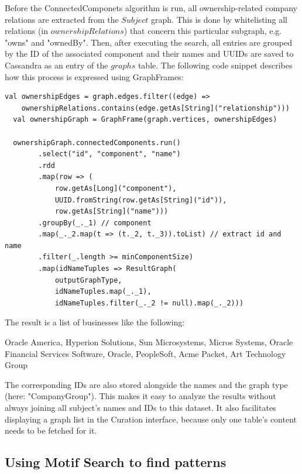 \documentclass[
        a4paper,     %
        titlepage,   %
        oneside,     %
        parskip      %
        ]{scrartcl}  %
\begin{document}
  Before the ConnectedComponets algorithm is run, all ownership-related company
  relations are extracted from the $Subject$ graph. This is done by whitelisting
  all relations (in $ownershipRelations$) that concern this particular subgraph,
  e.g. "owns" and "ownedBy".
  Then, after executing the search, all entries are grouped by the ID of the
  associated component and their names and UUIDs are saved to Cassandra
  as an entry of the $graphs$ table. The following code snippet describes how
  this process is expressed using GraphFrames:

  \begin{lstlisting}[style=scalaStyle,caption=Company Group Extraction]
  val ownershipEdges = graph.edges.filter((edge) =>
    ownershipRelations.contains(edge.getAs[String]("relationship")))
  val ownershipGraph = GraphFrame(graph.vertices, ownershipEdges)

  ownershipGraph.connectedComponents.run()
		.select("id", "component", "name")
		.rdd
		.map(row => (
			row.getAs[Long]("component"),
			UUID.fromString(row.getAs[String]("id")),
			row.getAs[String]("name")))
		.groupBy(_._1) // component
		.map(_._2.map(t => (t._2, t._3)).toList) // extract id and name
		.filter(_.length >= minComponentSize)
		.map(idNameTuples => ResultGraph(
			outputGraphType,
			idNameTuples.map(_._1),
			idNameTuples.filter(_._2 != null).map(_._2)))
  \end{lstlisting}

  The result is a list of businesses like the following:

  Oracle America, Hyperion Solutions, Sun Microsystems, Micros Systems, Oracle Financial Services Software, Oracle, PeopleSoft, Acme Packet, Art Technology Group

  The corresponding IDs are also stored alongside the names and the graph type (here: "CompanyGroup"). This makes it easy to analyze
  the results without always joining all subject's names and IDs to this dataset. It also facilitates displaying
  a graph list in the Curation interface, because only one table's content needs to be fetched for it.

  \subsection{Using Motif Search to find patterns}


  \pagebreak
\end{document}
